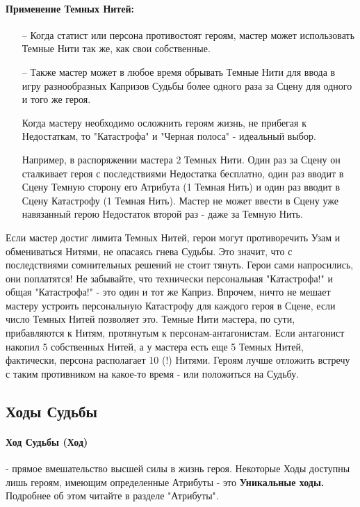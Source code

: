 \paragraph{Применение Темных Нитей:}
\begin{itemize}
    \item[--] Когда статист или персона противостоят героям, мастер может использовать Темные Нити так же, как свои собственные.
    \item[--] Также мастер может в любое время обрывать Темные Нити для ввода в игру разнообразных Капризов Судьбы более одного раза за Сцену для одного и того же героя.
    \begin{tcolorbox}
        Когда мастеру необходимо осложнить героям жизнь, не прибегая к Недостаткам, то "Катастрофа" и "Черная полоса" - идеальный выбор.
    \end{tcolorbox}
    Например, в распоряжении мастера 2 Темных Нити. Один раз за Сцену он сталкивает героя с последствиями Недостатка бесплатно, один раз вводит в Сцену Темную сторону его Атрибута (1 Темная Нить) и один раз вводит в Сцену Катастрофу (1 Темная Нить). Мастер не может ввести в Сцену уже навязанный герою Недостаток второй раз - даже за Темную Нить.
\end{itemize}
Если мастер достиг лимита Темных Нитей, герои могут противоречить Узам и обмениваться Нитями, не опасаясь гнева Судьбы. Это значит, что с последствиями сомнительных решений не стоит тянуть. Герои сами напросились, они поплатятся!
\newline Не забывайте, что технически персональная "Катастрофа!" и общая "Катастрофа!" - это один и тот же Каприз. Впрочем, ничто не мешает мастеру устроить персональную Катастрофу для каждого героя в Сцене, если число Темных Нитей позволяет это.
\newline Темные Нити мастера, по сути, прибавляются к Нитям, протянутым к персонам-антагонистам. Если антагонист накопил 5 собственных Нитей, а у мастера есть еще 5 Темных Нитей, фактически, персона располагает 10 (!) Нитями. Героям лучше отложить встречу с таким противником на какое-то время - или положиться на Судьбу.

\subsection{Ходы Судьбы}
\paragraph{Ход Судьбы (Ход)} - прямое вмешательство высшей силы в жизнь героя. Некоторые Ходы доступны лишь героям, имеющим определенные Атрибуты - это  \textbf{Уникальные ходы.} Подробнее об этом читайте в разделе "Атрибуты".
